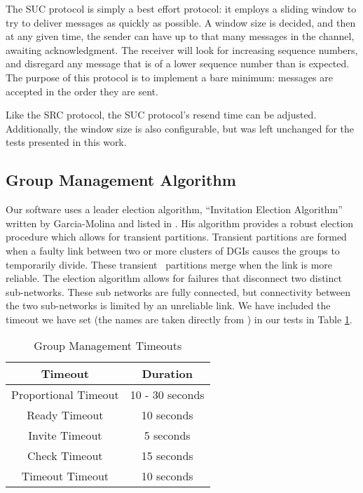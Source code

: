 The SUC protocol is simply a best effort protocol: it employs a sliding window to try to deliver messages as quickly as possible. A window size is decided, and then at any given time, the sender can have up to that many messages in the channel, awaiting acknowledgment. The receiver will look for increasing sequence numbers, and disregard any message that is of a lower sequence number than is expected. The purpose of this protocol is to implement a bare minimum: messages are accepted in the order they are sent.

Like the SRC protocol, the SUC protocol's resend time can be adjusted. Additionally, the window size is also configurable, but was left unchanged for the tests presented in this work.

\subsection{Group Management Algorithm}

Our software uses a leader election algorithm, ``Invitation Election Algorithm'' written by Garcia-Molina and listed in \cite{INVITATIONELECTION}. His algorithm provides a robust election procedure which allows for transient partitions. Transient partitions are formed when a faulty link between two or more clusters of DGIs causes the groups to temporarily divide. These transient  partitions merge when the link is more reliable. The election algorithm allows for failures that disconnect two distinct sub-networks. These sub networks are fully connected, but connectivity between the two sub-networks is limited by an unreliable link.  We have included the timeout we have set (the names are taken directly from \cite{INVITATIONELECTION}) in our tests in Table \ref{Table:Timeouts}.


\begin{table}
\caption{Group Management Timeouts}
\label{Table:Timeouts}
\centering
\begin{tabular}{ c c }
\hline
Timeout & Duration \\ \hline \hline
Proportional Timeout & 10 - 30 seconds \\ \hline
Ready Timeout & 10 seconds \\ \hline
Invite Timeout & 5 seconds \\ \hline
Check Timeout & 15 seconds \\ \hline
Timeout Timeout & 10 seconds \\ \hline
\end{tabular}
\end{table}

